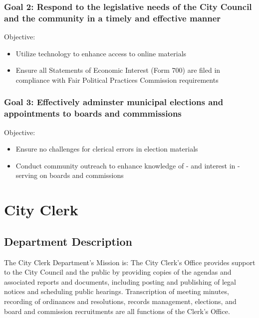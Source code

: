 \subsubsection{Goal 2: Respond to the legislative needs of the City Council and the community in a timely and effective manner}
Objective:
\begin{itemize}
\bulletl
\item Utilize technology to enhance access to online materials
\item Ensure all Statements of Economic Interest (Form 700) are filed in compliance with Fair Political Practices Commission requirements
\end{itemize}
\subsubsection{Goal 3: Effectively adminster municipal elections and appointments to boards and commmissions}
Objective:
\begin{itemize}
\bulletl
\item Ensure no challenges for clerical errors in election materials
\item Conduct community outreach to enhance knowledge of - and interest in - serving on boards and commissions
\end{itemize}
\section{City Clerk}
{}
\subsection{Department Description}
The City Clerk Department's Mission is:
{}
The City Clerk's Office provides support to the City Council and the public by providing copies of the agendas and associated reports and documents, including posting and publishing of legal notices and scheduling public hearings. Transcription of meeting minutes, recording of ordinances and resolutions, records management, elections, and board and commission recruitments are all functions of the Clerk's Office.
